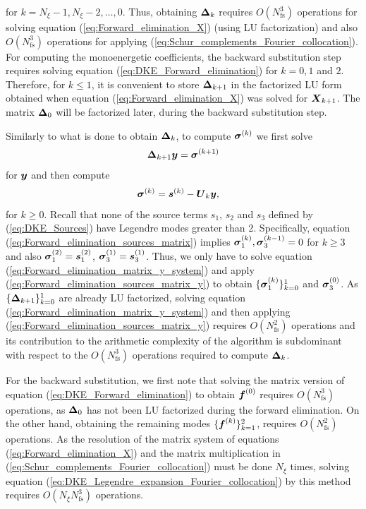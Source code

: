 \documentclass[10pt]{iopart}
\begin{document}
for $k=N_\xi-1, N_\xi-2, \ldots, 0$. Thus, obtaining $\vb*{\Delta}_k$ requires $O(N_{\text{fs}}^3)$ operations for solving equation (\ref{eq:Forward_elimination_X}) (using LU factorization) and also $O(N_{\text{fs}}^3)$ operations for applying (\ref{eq:Schur_complements_Fourier_collocation}). For computing the monoenergetic coefficients, the backward substitution step requires solving equation (\ref{eq:DKE_Forward_elimination}) for $k=0,1$ and $2$. Therefore, for $k\le 1$, it is convenient to store $\vb*{\Delta}_{k+1}$ in the factorized LU form obtained when equation (\ref{eq:Forward_elimination_X}) was solved for $\vb*{X}_{k+1}$. The matrix $\vb*{\Delta}_{0}$ will be factorized later, during the backward substitution step.

Similarly to what is done to obtain $\vb*{\Delta}_k$, to compute $\vb*{\sigma}^{(k)}$ we first solve 
%
\begin{align}
	\vb*{\Delta}_{k+1} \vb*{y} = \vb*{\sigma}^{(k+1)}
	\label{eq:Forward_elimination_matrix_y_system}
\end{align}
for $\vb*{y}$ and then compute
%
\begin{align}
	\vb*{\sigma}^{(k)} & = \vb*{s}^{(k)} - \vb*{U}_{k}  \vb*{y},
	\label{eq:Forward_elimination_sources_matrix_y}
\end{align}
%
for $k\ge 0$. Recall that none of the source terms $s_1$, $s_2$ and $s_3$ defined by (\ref{eq:DKE_Sources}) have Legendre modes greater than 2. Specifically, equation (\ref{eq:Forward_elimination_sources_matrix}) implies $\vb*{\sigma}_1^{(k)}, \vb*{\sigma}_3^{(k-1)} = 0$ for $k\ge 3$ and also $\vb*{\sigma}_1^{(2)} = \vb*{s}_1^{(2)}$, $\vb*{\sigma}_3^{(1)} = \vb*{s}_3^{(1)}$. Thus, we only have to solve equation (\ref{eq:Forward_elimination_matrix_y_system}) and apply (\ref{eq:Forward_elimination_sources_matrix_y}) to obtain $\{\vb*{\sigma}_1^{(k)}\}_{k=0}^{1}$ and $\vb*{\sigma}_3^{(0)}$. As $\{\vb*{\Delta}_{k+1}\}_{k=0}^{1}$ are already LU factorized, solving equation (\ref{eq:Forward_elimination_matrix_y_system}) and then applying (\ref{eq:Forward_elimination_sources_matrix_y}) requires $O(N_{\text{fs}}^2)$ operations and its contribution to the arithmetic complexity of the algorithm is subdominant with respect to the $O(N_{\text{fs}}^3)$ operations required to compute $\vb*{\Delta}_k$.

For the backward substitution, we first note that solving the matrix version of equation (\ref{eq:DKE_Forward_elimination}) to obtain $\vb*{f}^{(0)}$ requires $O(N_{\text{fs}}^3)$ operations, as $\vb*{\Delta}_0$ has not been LU factorized during the forward elimination. On the other hand, obtaining the remaining modes  $\{\vb*{f}^{(k)}\}_{k=1}^{2}$, requires $O(N_{\text{fs}}^2)$ operations. As the resolution of the matrix system of equations (\ref{eq:Forward_elimination_X}) and the matrix multiplication in (\ref{eq:Schur_complements_Fourier_collocation}) must be done $N_\xi$ times, solving equation (\ref{eq:DKE_Legendre_expansion_Fourier_collocation}) by this method requires $O(N_\xi N_{\text{fs}}^3)$ operations.
\end{document}
